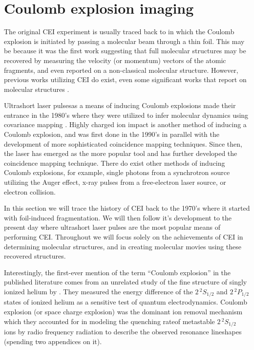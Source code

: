 \section{Coulomb explosion imaging}
The original CEI experiment is usually traced back to \citet{Vager89} in which the Coulomb explosion is initiated by passing a molecular beam through a thin foil. This may be because it was the first work suggesting that full molecular structures may be recovered by measuring the velocity (or momentum) vectors of the atomic fragments, and even reported on a non-classical molecular structure. However, previous works utilizing CEI do exist, even some significant works that report on molecular structures \citep{Kanter79}.

Ultrashort laser pulses\footnotemark as a means of inducing Coulomb explosions made their entrance in the 1980's where they were utilized to infer molecular dynamics using covariance mapping \citep{Frasinski89}. Highly charged ion impact is another method of inducing a Coulomb explosion, and was first done in the 1990's in parallel with the development of more sophisticated coincidence mapping techniques. Since then, the laser has emerged as the more popular tool and has further developed the coincidence mapping technique. There do exist other methods of inducing Coulomb explosions, for example, single photons from a synchrotron source utilizing the Auger effect, x-ray pulses from a free-electron laser source, or electron collision.


In this section we will trace the history of CEI back to the 1970's where it started with foil-induced fragmentation. We will then follow it's development to the present day where ultrashort laser pulses are the most popular means of performing CEI. Throughout we will focus solely on the achievements of CEI in determining molecular structures, and in creating molecular movies using these recovered structures.\footnotemark


Interestingly, the first-ever mention of the term ``Coulomb explosion'' in the published literature comes from an unrelated study of the fine structure of singly ionized helium by \citet{Novick55}. They measured the energy difference of the $2 \, ^2 S_{1/2}$ and $2 \, ^2 P_{1/2}$ states of ionized helium as a sensitive test of quantum electrodynamics. Coulomb explosion (or space charge explosion) was the dominant ion removal mechanism which they accounted for in modeling the quenching rate\footnotemark of metastable $2 \, ^2 S_{1/2}$ ions by radio frequency radiation to describe the observed resonance lineshapes (spending two appendices on it).

